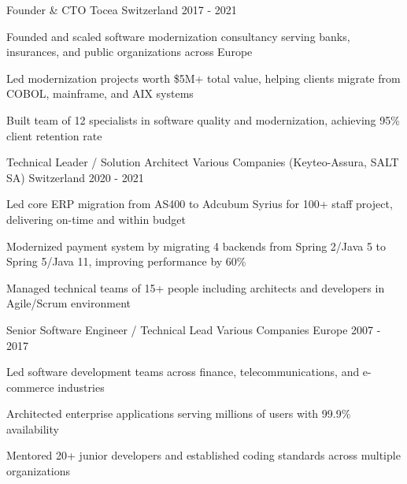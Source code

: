\begin{cventries}
{\begin{cvitems}
        \end{cvitems}
    }
    \cventry
    {Founder \& CTO} %
    {Tocea} %
    {Switzerland} %
    {2017 - 2021} %
    {
        \begin{cvitems} %
            \item{Founded and scaled software modernization consultancy serving banks, insurances, and public organizations across Europe}
            \item{Led modernization projects worth \$5M+ total value, helping clients migrate from COBOL, mainframe, and AIX systems}
            \item{Built team of 12 specialists in software quality and modernization, achieving 95\% client retention rate}
        \end{cvitems}
    }
    \cventry
    {Technical Leader / Solution Architect} %
    {Various Companies (Keyteo-Assura, SALT SA)} %
    {Switzerland} %
    {2020 - 2021} %
    {
        \begin{cvitems} %
            \item{Led core ERP migration from AS400 to Adcubum Syrius for 100+ staff project, delivering on-time and within budget}
            \item{Modernized payment system by migrating 4 backends from Spring 2/Java 5 to Spring 5/Java 11, improving performance by 60\%}
            \item{Managed technical teams of 15+ people including architects and developers in Agile/Scrum environment}
        \end{cvitems}
    }
    \cventry
    {Senior Software Engineer / Technical Lead} %
    {Various Companies} %
    {Europe} %
    {2007 - 2017} %
    {
        \begin{cvitems} %
            \item{Led software development teams across finance, telecommunications, and e-commerce industries}
            \item{Architected enterprise applications serving millions of users with 99.9\% availability}
            \item{Mentored 20+ junior developers and established coding standards across multiple organizations}
        \end{cvitems}
    }
\end{cventries}
